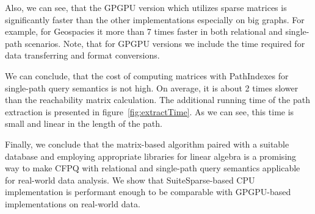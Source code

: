 Also, we can see, that the GPGPU version which utilizes sparse matrices is significantly faster than the other implementations especially on big graphs. For example, for Geospacies it more than 7 times faster in both relational and single-path scenarios.
Note, that for GPGPU versions we include the time required for data transferring and format conversions.

We can conclude, that the cost of computing matrices with PathIndexes for single-path query semantics is not high. On average, it is about 2 times slower than the reachability matrix calculation. The additional running time of the path extraction is presented in figure~\ref{fig:extractTime}. As we can see, this time is small and linear in the length of the path.

Finally, we conclude that the matrix-based algorithm paired with a suitable database and employing appropriate libraries for linear algebra is a promising way to make CFPQ with relational and single-path query semantics applicable for real-world data analysis.
We show that SuiteSparse-based CPU implementation is performant enough to be comparable with GPGPU-based implementations on real-world data.



